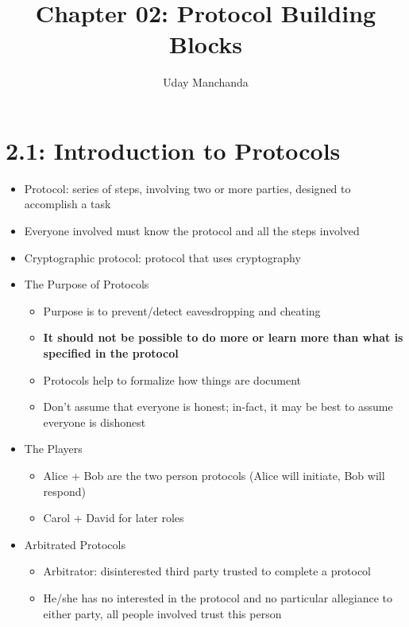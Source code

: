 \documentclass[]{article}
\title{Chapter 02: Protocol Building Blocks}
\author{Uday Manchanda}
\begin{document}
\maketitle

\begin{abstract}
\end{abstract}

\section{2.1: Introduction to Protocols}
\begin{itemize}
    \item Protocol: series of steps, involving two or more parties, designed to accomplish a task
    \item Everyone involved must know the protocol and all the steps involved
    \item Cryptographic protocol: protocol that uses cryptography
    \item The Purpose of Protocols
    \begin{itemize}
        \item Purpose is to prevent/detect eavesdropping and cheating
        \item \textbf{It should not be possible to do more or learn more than what is specified in the protocol}
        \item Protocols help to formalize how things are document
        \item Don't assume that everyone is honest; in-fact, it may be best to assume everyone is dishonest
    \end{itemize}
    \item The Players
    \begin{itemize}
        \item Alice + Bob are the two person protocols (Alice will initiate, Bob will respond)
        \item Carol + David for later roles
    \end{itemize}
    \item Arbitrated Protocols
    \begin{itemize}
        \item Arbitrator: disinterested third party trusted to complete a protocol
        \item He/she has no interested in the protocol and no particular allegiance to either party, all people involved trust this person

\end{itemize}
\end{itemize}
\end{document}
